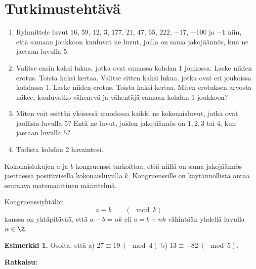 \section*{Tutkimustehtävä}
\begin{enumerate}
\item Ryhmittele luvut $16$, $59$, $12$, $3$, $177$, $21$, $47$, $65$, $222$, $-17$, $-100$ ja $-1$ niin, että samaan joukkoon kuuluvat ne luvut, joilla on sama jakojäännös, kun ne jaetaan luvulla $5$.
\item Valitse ensin kaksi lukua, jotka ovat samassa kohdan 1 joukossa. Laske niiden erotus. Toista kaksi kertaa. Valitse sitten kaksi lukua, jotka ovat eri joukoissa kohdassa 1. Laske niiden erotus. Toista kaksi kertaa. Miten erotuksen arvosta näkee, kuuluvatko vähenevä ja vähentäjä samaan kohdan 1 joukkoon?
\item Miten voit esittää yleisessä muodossa kaikki ne kokonaisluvut, jotka ovat jaollisia luvulla $5$? Entä ne luvut, joiden jakojäännös on $1, 2, 3$ tai $4$, kun jaetaan luvulla $5$?
\item Todista kohdan 2 havaintosi.
\end{enumerate}

Kokonaislukujen $a$ ja $b$ kongruenssi tarkoittaa, että niillä on sama jakojäännös jaettaessa positiivisella kokonaisluvulla $k$. Kongruenssille on käytännöllistä antaa seuraava matemaattinen määritelmä.



Kongruenssiyhtälön
\[
a\equiv b\qquad (\mod k)
\]
kanssa on yhtäpitävää, että $a-b=nk$ eli $a=b+nk$ vähintään yhdellä luvulla $n\in \Z$.


{\bf Esimerkki 1.} 
Osoita, että a) $27 \equiv 19 \ (\mod 4)$ b) $13 \equiv -82 \ (\mod 5)$.

{\bf Ratkaisu:}

